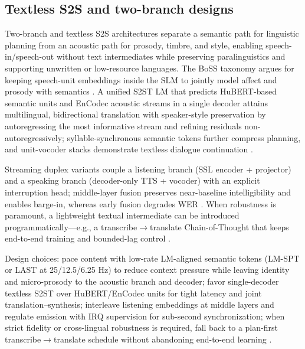\documentclass{article}
\begin{document}
\subsection{Textless S2S and two-branch designs} \label{subsec:textlesss2sandtwo-branchdesigns}
Two-branch and textless S2S architectures separate a semantic path for linguistic planning from an acoustic path for prosody, timbre, and style, enabling speech-in/speech-out without text intermediates while preserving paralinguistics and supporting unwritten or low-resource languages. The BoSS taxonomy argues for keeping speech-unit embeddings inside the SLM to jointly model affect and prosody with semantics \cite{wang2025bossbeyondsemanticspeech}. A unified S2ST LM that predicts HuBERT-based semantic units and EnCodec acoustic streams in a single decoder attains multilingual, bidirectional translation with speaker-style preservation by autoregressing the most informative stream and refining residuals non-autoregressively; syllable-synchronous semantic tokens further compress planning, and unit-vocoder stacks demonstrate textless dialogue continuation \cite{peng2024mslms2stmultitaskspeechlanguagemodeltext,baade2024syllablelmlearningcoarsesemanticunitsspe,nakata2024jchatjapaneselargescalespokendialoguecor}.

Streaming duplex variants couple a listening branch (SSL encoder + projector) and a speaking branch (decoder-only TTS + vocoder) with an explicit interruption head; middle-layer fusion preserves near-baseline intelligibility and enables barge-in, whereas early fusion degrades WER \cite{ma2024languagemodelcanlistenwhilespeaking}. When robustness is paramount, a lightweight textual intermediate can be introduced programmatically---e.g., a transcribe$\rightarrow$translate Chain-of-Thought that keeps end-to-end training and bounded-lag control \cite{guo2025streamuniachievingstreamingspeechtransla}.

Design choices: pace content with low-rate LM-aligned semantic tokens (LM-SPT or LAST at 25/12.5/6.25 Hz) to reduce context pressure while leaving identity and micro-prosody to the acoustic branch and decoder; favor single-decoder textless S2ST over HuBERT/EnCodec units for tight latency and joint translation--synthesis; interleave listening embeddings at middle layers and regulate emission with IRQ supervision for sub-second synchronization; when strict fidelity or cross-lingual robustness is required, fall back to a plan-first transcribe$\rightarrow$translate schedule without abandoning end-to-end learning \cite{jo2025lmsptalignedsemanticdistillationspeechto,turetzky2024lastlanguagemodelawarespeechtokenization,entry2025towardjointlanguagemodelingspeechunitste,ma2024languagemodelcanlistenwhilespeaking,guo2025streamuniachievingstreamingspeechtransla,qian2025prosodylmuncoveringemergingprosodyproces}.
\end{document}
